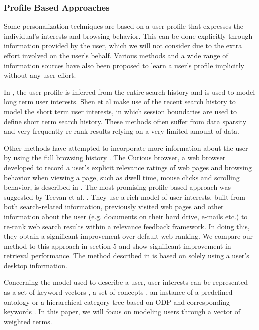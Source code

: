 \documentclass{sig-alternate}
\begin{document}
\subsubsection*{Profile Based Approaches}

Some personalization techniques \cite{Teevan:Main, Qiu:Cho, Sugiyama:Hatano} are based on a user profile that expresses the individual's interests and browsing behavior. This can be done explicitly through information provided by the user, which we will not consider due to the extra effort involved on the user's behalf. Various methods and a wide range of information sources have also been proposed to learn a user's profile implicitly without any user effort.

In \cite{Daoud:Tamine}, the user profile is inferred from the entire search history and is used to model long term user interests. Shen et al \cite{Shen:Tan} make use of the recent search history to model the short term user interests, in which session boundaries are used to define short term search history. These methods often suffer from data sparsity and very frequently re-rank results relying on a very limited amount of data.

Other methods have attempted to incorporate more information about the user by using the full browsing history \cite{Sugiyama:Hatano, Morita:Shinoda}. The Curious browser, a web browser developed to record a user's explicit relevance ratings of web pages and browsing behavior when viewing a page, such as dwell time, mouse clicks and scrolling behavior, is described in \cite{Claypool:Le}.  The most promising profile based approach was suggested by Teevan et al. \cite{Teevan:Main}. They use a rich model of user interests, built from both search-related information, previously visited web pages and other information about the user (e.g. documents on their hard drive, e-mails etc.) to re-rank web search results within a relevance feedback framework. In doing this, they obtain a significant improvement over default web ranking. We compare our method to this approach in section 5 and show significant improvement in retrieval performance. The method described in \cite{Chirita:Firan} is based on solely using a user's desktop information.

Concerning the model used to describe a user, user interests can be represented as a set of keyword vectors \cite{Daoud:Lechani}, a set of concepts \cite{Liu:Yubis}, an instance of a predefined ontology \cite{Gauch:Chaffee, Sieg:Mobasher, Pretschner:Gauch, Tanudjaja:Mui} or a hierarchical category tree based on ODP and corresponding keywords \cite{Liu:Yu, Chirita:Nejdl}. In this paper, we will focus on modeling users through a vector of weighted terms.
\end{document}
